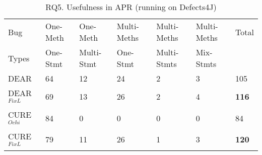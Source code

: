 \begin{table}[t]
	\caption{RQ5. Usefulness in APR (running on Defects4J)}
	\vspace{-12pt}
	\begin{center}
        \tabcolsep 2pt
		\footnotesize
		\renewcommand{\arraystretch}{1} 
		\begin{tabular}{p{1cm}<{\centering}|p{1.05cm}<{\centering}|p{1.1cm}<{\centering}|p{1.3cm}<{\centering}|p{1.3cm}<{\centering}|p{1.3cm}<{\centering}|p{0.35cm}<{\centering}}
			\hline
			Bug            & One-Meth & One-Meth   & Multi-Meths & Multi-Meths & Multi-Meths & Total\\
			Types          & One-Stmt & Multi-Stmt & One-Stmt    & Multi-Stmts & Mix-Stmts   & \\\hline
			DEAR%
			& 64       & 12         & 24          & 2           & 3           & 105\\
			DEAR$^{FixL}$     & 69       & 13         & 26          & 2           & 4           & {\bf 116}\\
                        \hline
                       
			CURE$^{Ochi}$%
			        & 84       & 0          & 0           & 0           & 0           & 84\\
			CURE$^{FixL}$    & 79       & 11         & 26          & 1           & 3           & {\bf 120}\\   
			\hline
		\end{tabular}
		\label{RQ5_1}
	\end{center}
\vspace{-5pt}
\end{table}

